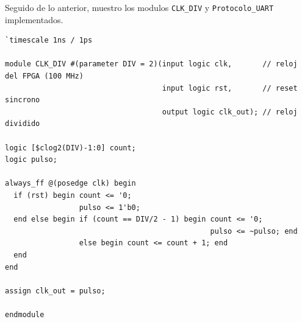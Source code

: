\documentclass[letterpaper, 12pt]{article}
\begin{document}
Seguido de lo anterior, muestro los modulos \texttt{CLK\_DIV} y \texttt{Protocolo\_UART} implementados.

\begin{lstlisting}
`timescale 1ns / 1ps

module CLK_DIV #(parameter DIV = 2)(input logic clk,       // reloj del FPGA (100 MHz)
                                    input logic rst,       // reset sincrono
                                    output logic clk_out); // reloj dividido

logic [$clog2(DIV)-1:0] count;
logic pulso;

always_ff @(posedge clk) begin
  if (rst) begin count <= '0;
                 pulso <= 1'b0;
  end else begin if (count == DIV/2 - 1) begin count <= '0;
                                               pulso <= ~pulso; end
                 else begin count <= count + 1; end
  end
end
  
assign clk_out = pulso;

endmodule
\end{lstlisting}
\end{document}
